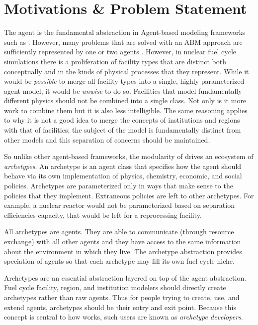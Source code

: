 \section{Motivations \& Problem Statement}
\label{sec-motive}

The agent is the fundamental abstraction in Agent-based modeling frameworks 
such as \cyclus. However, many problems that are 
solved with an \gls{ABM} approach are sufficiently represented by one or two 
agents \cite{taylor2014agent}. However, in nuclear fuel cycle simulations there is
a proliferation of facility types that are distinct both conceptually and in the 
kinds of physical processes that they represent. While it would be \emph{possible}
to merge all facility types into a single, highly parameterized agent model,
it would be \emph{unwise} to do so. Facilities that model fundamentally different
physics should not be combined into a single class. Not only is it more work to 
combine them but it is also less intelligible. The same reasoning applies to why it is 
not a good idea to merge the concepts of institutions and regions with that of
facilities; the subject of the model is fundamentally distinct from other models
and this separation of concerns should be maintained.

So unlike other agent-based frameworks, the modularity of \cyclus drives 
an ecosystem of \emph{archetypes}. An archetype is an agent class that specifies 
how the agent should behave via its own implementation of physics, chemistry, 
economic, and social policies. Archetypes are parameterized only in ways that 
make sense to the policies that they implement. Extraneous policies are left to 
other archetypes. For example, a nuclear reactor would not be parameterized based 
on separation efficiencies capacity, that would be left for a reprocessing facility.

All archetypes are agents. They are able to communicate (through resource 
exchange) with all other agents and they have access to the same information 
about the environment in which they live. The archetype abstraction provides
speciation of agents so that each archetype may fill its own fuel cycle niche.

Archetypes are an essential abstraction layered on top of the agent abstraction. 
Fuel cycle facility, region, and institution modelers should directly create
archetypes rather than raw agents. Thus for people trying to create, use, and 
extend \cyclus agents, archetypes should be their entry and exit point. Because this 
concept is central to how \cyclus works, such users are known as \emph{archetype
developers}.

